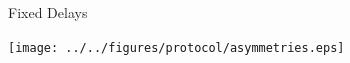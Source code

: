 \documentclass[compress,red]{beamer}
\begin{document}
\begin{frame}{Fixed Delays}

  \begin{center}
  \texttt{[image: ../../figures/protocol/asymmetries.eps]}
  \end{center}

\end{frame}
\end{document}
